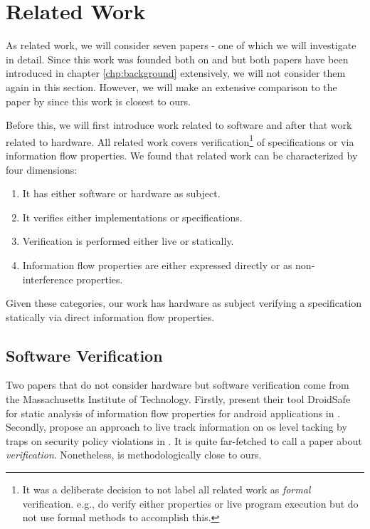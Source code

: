 
\chapter{Related Work}
\label{chp:related-work}

As related work, we will consider seven papers - one of which we will investigate in detail.
Since this work was founded both on  \cite{Reid17} and  \cite{Ferraiuolo17} but both papers have been introduced in chapter \ref{chp:background} extensively, we will not consider them again in this section.
However, we will make an extensive comparison to the paper  \cite{BradfieldS16} by \citeauthor{BradfieldS16} since this work is closest to ours.

Before this, we will first introduce work related to software and after that work related to hardware.
All related work covers verification\footnote{%
    It was a deliberate decision to not label all related work as \textit{formal} verification.
    e.g., \cite{Zhang15,SuhLZD04} do verify either properties or live program execution but do not use formal methods to accomplish this.
} of specifications or via information flow properties.
We found that related work can be characterized by four dimensions:
\begin{enumerate}
    \item It has either software or hardware as subject.
    \item It verifies either implementations or specifications.
    \item Verification is performed either live or statically.
    \item Information flow properties are either expressed directly or as non-interference properties.
\end{enumerate}

Given these categories, our work has hardware as subject verifying a specification statically via direct information flow properties.

\section{Software Verification}

Two papers that do not consider hardware but software verification come from the Massachusetts Institute of Technology.
Firstly, \citeauthor{GordonKPGNR15} present their tool DroidSafe for static analysis of information flow properties for android applications in  \cite{GordonKPGNR15}.
Secondly, \citeauthor{SuhLZD04} propose an approach to live track information on \gls{os} level tacking by traps on security policy violations in  \cite{SuhLZD04}.
It is quite far-fetched to call \cite{SuhLZD04} a paper about \textit{verification}.
Nonetheless, is methodologically close to ours.

